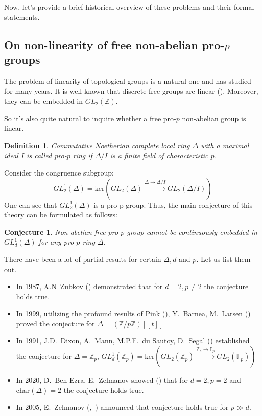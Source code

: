 \documentclass[12pt,a4paper]{article}
\newtheorem*{conjecture*}{Conjecture}
\newtheorem{definition}{Definition}[subsection]
\begin{document}
    Now, let's provide a brief historical overview of these problems and their formal statements.

    \subsection{On non-linearity of free non-abelian pro-$p$ groups}
    The problem of linearity of topological groups is a natural one and has studied for many years.
    It is well known that discrete free groups are linear (\cite{Sanov}).
    Moreover, they can be embedded in $GL_2(\mathbb{Z})$.

    So it's also quite natural to inquire whether a free pro-$p$ non-abelian group is linear.

    \vskip 0.1in\noindent
    \begin{definition}
        Commutative Noetherian complete local ring $\Delta$ with a maximal ideal $I$ is called pro-$p$ ring if $\Delta/I$ is a finite field of characteristic $p$.
    \end{definition}
    \vskip 0.1in\noindent

    Consider the congruence subgroup:
    \[GL_2^1(\Delta) = \mathrm{ker}\left( GL_2(\Delta) \xrightarrow{\Delta\to\Delta/I} GL_2(\Delta/I) \right)\]
    One can see that $GL_2^1(\Delta)$ is a pro-p-group.
    Thus, the main conjecture of this theory can be formulated as follows:
    \vskip 0.1in\noindent
    \begin{conjecture*}
        Non-abelian free pro-$p$ group cannot be continuously embedded in $GL_d^1(\Delta)$ for any pro-$p$ ring $\Delta$.
    \end{conjecture*}
    \vskip 0.1in\noindent

    There have been a lot of partial results for certain $\Delta, d$ and $p$.
    Let us list them out.
    \begin{itemize}
        \item In 1987, A.N\ Zubkov (\cite{Zubkov}) demonstrated that for $d=2, p\neq2$ the conjecture holds true.
        \item In 1999, utilizing the profound results of Pink (\cite{Pink}), Y.\ Barnea, M.\ Larsen (\cite{Barnea-Larsen}) proved the conjecture for $\Delta=\left( \mathbb{Z}/p\mathbb{Z} \right)[[t]]$
        \item In 1991, J.D.\ Dixon, A.\ Mann, M.P.F.\ du Sautoy, D.\ Segal (\cite{DMSD}) established the conjecture for $\Delta=\mathbb{Z}_p$, $GL_d^1(\mathbb{Z}_p)=\mathrm{ker}\left( GL_2(\mathbb{Z}_p) \xrightarrow{\mathbb{Z}_p\to\mathbb{F}_p} GL_2(\mathbb{F}_p) \right)$
        \item In 2020, D.\ Ben-Ezra, E.\ Zelmanov showed (\cite{Ben-Ezra-Zelmanov}) that for $d=2, p=2$ and $\mathrm{char}(\Delta)=2$  the conjecture holds true.
        \item In 2005, E.\ Zelmanov (\cite{Zelmanov1},~\cite{Zelmanov2}) announced that conjecture holds true for $p\gg d$.
    \end{itemize}
\end{document}
